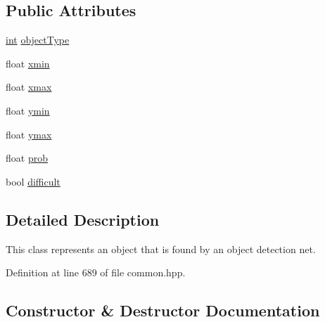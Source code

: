 \subsection*{Public Attributes}
\begin{DoxyCompactItemize}
\item 
\hyperlink{CMakeCache_8txt_a79a3d8790b2588b09777910863574e09}{int} \hyperlink{classDetectedObject_aff19c53a4ee1d27656acf6b6fbd9cfa0}{object\+Type}
\item 
float \hyperlink{classDetectedObject_af6a124efdbada32ae6cc6ed8207957ba}{xmin}
\item 
float \hyperlink{classDetectedObject_a8e120d3f08cb0f6c41b10a082bd0df04}{xmax}
\item 
float \hyperlink{classDetectedObject_a18ef6bb15e7c47d41d9c2c9d4b8b133c}{ymin}
\item 
float \hyperlink{classDetectedObject_ab130fc061e711904966077c8b8e294e7}{ymax}
\item 
float \hyperlink{classDetectedObject_a1d49d73edce36d93ee88b202bdcb961d}{prob}
\item 
bool \hyperlink{classDetectedObject_a11e8106cf6abc1bab40e292001930fa2}{difficult}
\end{DoxyCompactItemize}


\subsection{Detailed Description}
This class represents an object that is found by an object detection net. 

Definition at line 689 of file common.\+hpp.



\subsection{Constructor \& Destructor Documentation}
